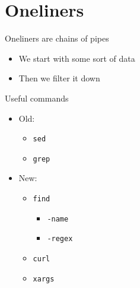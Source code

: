 \documentclass[ignorenonframetext,]{beamer}
\newenvironment{Shaded}{}{}
\newcommand{\KeywordTok}[1]{\textcolor[rgb]{0.00,0.44,0.13}{\textbf{{#1}}}}
\newcommand{\CommentTok}[1]{\textcolor[rgb]{0.38,0.63,0.69}{\textit{{#1}}}}
\newcommand{\NormalTok}[1]{{#1}}
\providecommand{\tightlist}{%
  \setlength{\itemsep}{0pt}\setlength{\parskip}{0pt}}
\begin{document}
\section{Oneliners}\label{oneliners}

\begin{frame}[fragile]{Oneliners are chains of pipes}

\begin{itemize}
\tightlist
\item
  We start with some sort of data
\item
  Then we filter it down
\end{itemize}

\begin{Shaded}
\end{Shaded}

\end{frame}

\begin{frame}[fragile]{Useful commands}

\begin{itemize}
\tightlist
\item
  Old:

  \begin{itemize}
  \tightlist
  \item
    \texttt{sed}
  \item
    \texttt{grep}
  \end{itemize}
\item
  New:

  \begin{itemize}
  \tightlist
  \item
    \texttt{find}

    \begin{itemize}
    \tightlist
    \item
      \texttt{-name}
    \item
      \texttt{-regex}
    \end{itemize}
  \item
    \texttt{curl}
  \item
    \texttt{xargs}
  \end{itemize}
\end{itemize}

\end{frame}
\end{document}
